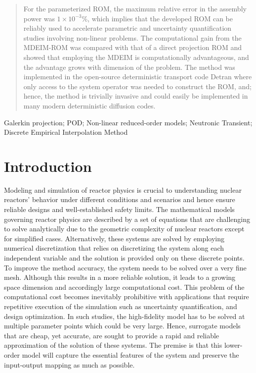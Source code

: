 \documentclass[]{interact}
\theoremstyle{plain}%
\theoremstyle{definition}
\theoremstyle{remark}
\begin{document}
\begin{abstract}
For the parameterized ROM, the maximum relative error in the assembly power was $1\times 10^{-3}$\%, which implies that the developed ROM can be reliably used to accelerate parametric and uncertainty quantification studies involving non-linear problems.
The computational gain from the MDEIM-ROM was compared with that of a direct projection ROM and showed that employing the MDEIM is computationally advantageous, and the advantage grows with dimension of the problem.
The method was implemented in the open-source deterministic transport code Detran\cite{roberts2014advanced} where only access to the system operator was needed to construct the ROM, and; hence, the method is trivially invasive and could easily be implemented in many modern deterministic diffusion codes.


\end{abstract}

\begin{keywords}
Galerkin projection; POD; Non-linear reduced-order models; Neutronic Transient; Discrete Empirical Interpolation Method
\end{keywords}


\section{Introduction}
Modeling and simulation of reactor physics is crucial to understanding nuclear reactors' behavior under different conditions and scenarios and hence ensure reliable designs and well-established safety limits.
The mathematical models governing reactor physics are described by a set of equations that are challenging to solve analytically due to the geometric complexity of nuclear reactors except for simplified cases.
Alternatively, these systems are solved by employing numerical discretization that relies on discretizing the system along each independent variable and the solution is provided only on these discrete points.
To improve the method accuracy, the system needs to be solved over a very fine mesh.
Although this results in a more reliable solution, it leads to a growing space dimension and accordingly large computational cost.
This problem of the computational cost becomes inevitably prohibitive with applications that require repetitive execution of the simulation such as uncertainty quantification, and design optimization.
In such studies, the high-fidelity model has to be solved at multiple parameter points which could be very large.
Hence, surrogate models that are cheap, yet accurate, are sought to provide a rapid and reliable approximation of the solution of these systems.
The premise is that this lower-order model will capture the essential features of the system and preserve the input-output mapping as much as possible.
\end{document}
